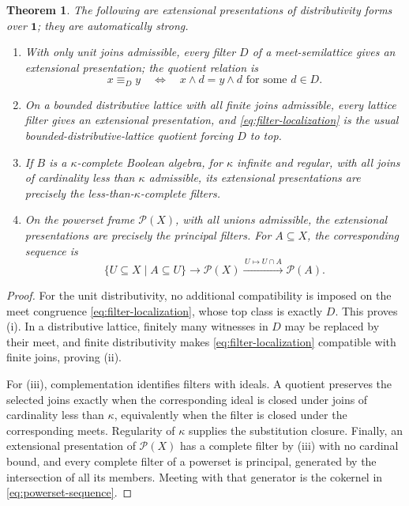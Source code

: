 \documentclass[12pt,oneside,reqno]{amsart}
\newtheorem{theorem}{Theorem}[section]
\theoremstyle{definition}
\theoremstyle{remark}
\begin{document}
\begin{theorem}\label{thm:terminal-computations}
The following are extensional presentations of distributivity forms over
\(\mathbf1\); they are automatically strong.
\begin{enumerate}[label=\textup{(\roman*)}]
\item With only unit joins admissible, every filter \(D\) of a
meet-semilattice gives an extensional presentation; the quotient
relation is
\begin{equation}\label{eq:filter-localization}
 x\equiv_Dy
 \quad\Longleftrightarrow\quad
 x\wedge d=y\wedge d\text{ for some }d\in D.
\end{equation}
\item On a bounded distributive lattice with all finite joins
admissible, every lattice filter gives an extensional presentation, and
\eqref{eq:filter-localization} is the usual bounded-distributive-lattice
quotient forcing \(D\) to top.
\item If \(B\) is a \(\kappa\)-complete Boolean algebra, for
\(\kappa\) infinite and regular, with all joins of cardinality less
than \(\kappa\) admissible, its extensional presentations are precisely
the less-than-\(\kappa\)-complete filters.
\item On the powerset frame \(\mathcal P(X)\), with all unions
admissible, the extensional presentations are precisely the principal
filters.  For
\(A\subseteq X\), the corresponding sequence is
\begin{equation}\label{eq:powerset-sequence}
 \{U\subseteq X\mid A\subseteq U\}
 \longrightarrow\mathcal P(X)
 \xrightarrow{\,U\mapsto U\cap A\,}\mathcal P(A)
 .
\end{equation}
\end{enumerate}
\end{theorem}

\begin{proof}
For the unit distributivity, no additional compatibility is imposed on
the meet congruence \eqref{eq:filter-localization}, whose top class is
exactly \(D\).  This proves (i).  In a distributive lattice, finitely
many witnesses in \(D\) may be replaced by their meet, and finite
distributivity makes \eqref{eq:filter-localization} compatible with
finite joins, proving (ii).

For (iii), complementation identifies filters with ideals.  A quotient
preserves the selected joins exactly when the corresponding ideal is
closed under joins of cardinality less than \(\kappa\), equivalently
when the filter is closed under the corresponding meets.  Regularity of
\(\kappa\) supplies the substitution closure.  Finally, an extensional
presentation of \(\mathcal P(X)\) has a complete filter by (iii) with no cardinal bound,
and every complete filter of a powerset is principal, generated by the
intersection of all its members.  Meeting with that generator is the
cokernel in \eqref{eq:powerset-sequence}.
\end{proof}
\end{document}
